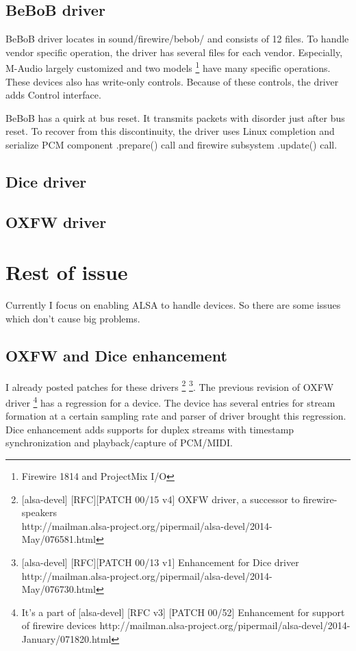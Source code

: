 \documentclass[onecolumn]{article}
\begin{document}
\subsection{BeBoB driver}

BeBoB driver locates in sound/firewire/bebob/ and consists of 12 files. To handle vendor specific operation, the driver has several files for each vendor. Especially, M-Audio largely customized and two models \footnote{Firewire 1814 and ProjectMix I/O} have many specific operations. These devices also has write-only controls. Because of these controls, the driver adds Control interface.

BeBoB has a quirk at bus reset. It transmits packets with disorder just after bus reset. To recover from this discontinuity, the driver uses Linux completion and serialize PCM component .prepare() call and firewire subsystem .update() call.

\subsection{Dice driver}

\subsection{OXFW driver}


\section{Rest of issue}

Currently I focus on enabling ALSA to handle devices. So there are some issues which don't cause big problems.

\subsection{OXFW and Dice enhancement}

I already posted patches for these drivers \footnote{[alsa-devel] [RFC][PATCH 00/15 v4] OXFW driver, a successor to firewire-speakers \\ http://mailman.alsa-project.org/pipermail/alsa-devel/2014-May/076581.html} \footnote{[alsa-devel] [RFC][PATCH 00/13 v1] Enhancement for Dice driver \\ http://mailman.alsa-project.org/pipermail/alsa-devel/2014-May/076730.html}. The previous revision of OXFW driver \footnote{It's a part of [alsa-devel] [RFC v3] [PATCH 00/52] Enhancement for support of firewire devices http://mailman.alsa-project.org/pipermail/alsa-devel/2014-January/071820.html} has a regression for a device. The device has several entries for stream formation at a certain sampling rate and parser of driver brought this regression. Dice enhancement adds supports for duplex streams with timestamp synchronization and playback/capture of PCM/MIDI.
\end{document}
